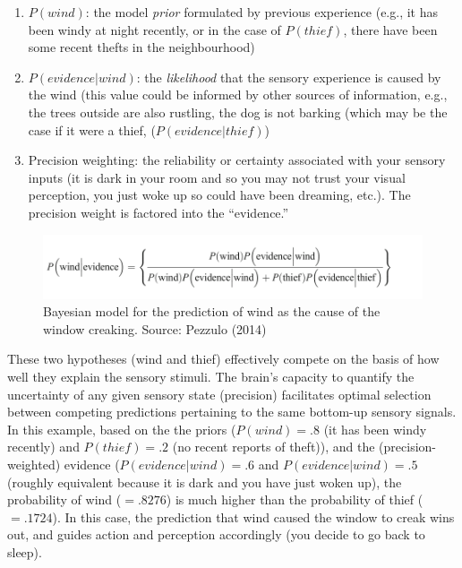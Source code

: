 \begin{CJK}{UTF8}{gbsn}
\begin{enumerate}
  \item $P(wind)$: the model \textit{prior} formulated by previous experience (e.g., it has been windy at night recently, or in the case of $P(thief)$, there have been some recent thefts in the neighbourhood)
  \item $P(evidence|wind)$: the \textit{likelihood} that the sensory experience is caused by the wind (this value could be informed by other sources of information, e.g., the trees outside are also rustling, the dog is not barking (which may be the case if it were a thief, ($P(evidence|thief)$)
  \item Precision weighting: the reliability or certainty associated with your sensory inputs (it is dark in your room and so you may not trust your visual perception, you just woke up so could have been dreaming, etc.).  The precision weight is factored into the ``evidence.''
\end{enumerate}


\begin{figure}[htbp]
  \begin{center}
    \includegraphics[scale=.5]{images/windThief.png}
      \caption{Bayesian model for the prediction of wind as the cause of the window creaking. Source: Pezzulo (2014)}
        \label{fig:windThief}
   \end{center}
\end{figure}

These two hypotheses (wind and thief) effectively compete on the basis of how well they explain the sensory stimuli.  The brain's capacity to quantify the uncertainty of any given sensory state (precision) facilitates optimal selection between competing predictions pertaining to the same bottom-up sensory signals.  In this example, based on the the priors ($P(wind) = .8$ (it has been windy recently) and $P(thief) = .2$ (no recent reports of theft)), and the (precision-weighted) evidence ($P(evidence|wind) = .6$ and $P(evidence|wind) = .5$ (roughly equivalent because it is dark and you have just woken up), the probability of wind ($= .8276$) is much higher than the probability of thief ($= .1724$).  In this case, the prediction that wind caused the window to creak wins out, and guides action and perception accordingly (you decide to go back to sleep).



\end{CJK}

